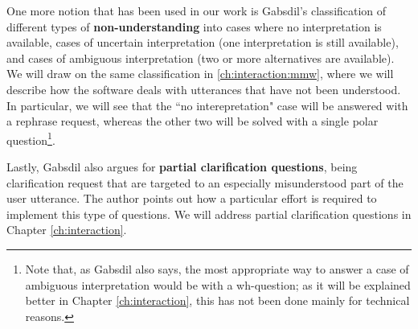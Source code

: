 One more notion that has been used in our work is Gabsdil's classification of different types of \textbf{non-understanding} into cases where no interpretation is available, cases of uncertain interpretation (one interpretation is still available), and cases of ambiguous interpretation (two or more alternatives are available). We will draw on the same classification in \ref{ch:interaction:mmw}, where we will describe how the software deals with utterances that have not been understood. In particular, we will see that the ``no interepretation" case will be answered with a rephrase request, whereas the other two will be solved with a single polar question\footnote{Note that, as Gabsdil also says, the most appropriate way to answer a case of ambiguous interpretation would be with a wh-question; as it will be explained better in Chapter \ref{ch:interaction}, this has not been done mainly for technical reasons.}.

Lastly, Gabsdil also argues for \textbf{partial clarification questions}, being clarification request that are targeted to an especially misunderstood part of the user utterance. The author points out how a particular effort is required to implement this type of questions. We will address partial clarification questions in Chapter \ref{ch:interaction}.